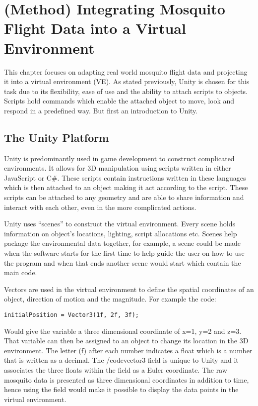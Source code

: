 \chapter{(Method) Integrating Mosquito Flight Data into a Virtual Environment}

This chapter focuses on adapting real world mosquito flight data and projecting it into a virtual environment (VE). As stated previously, Unity is chosen for this task due to its flexibility, ease of use and the ability to attach scripts to objects. Scripts hold commands which enable the attached object to move, look and respond in a predefined way. But first an introduction to Unity.

\section{The Unity Platform}
Unity is predominantly used in game development to construct complicated environments. It allows for 3D manipulation using scripts written in either JavaScript or C\#. These scripts contain instructions written in these languages which is then attached to an object making it act according to the script. These scripts can be attached to any geometry and are able to share information and interact with each other, even in the more complicated actions.

Unity uses ``scenes'' to construct the virtual environment. Every scene holds information on object's locations, lighting, script allocations etc. Scenes help package the environmental data together, for example, a scene could be made when the software starts for the first time to help guide the user on how to use the program and when that ends another scene would start which contain the main code.

Vectors are used in the virtual environment to define the spatial coordinates of an object, direction of motion and the magnitude. For example the code:

\begin{verbatim}
initialPosition = Vector3(1f, 2f, 3f);
\end{verbatim}

Would give the variable  a three dimensional coordinate of x=1, y=2 and z=3. That variable can then be assigned to an object to change its location in the 3D environment. The letter (f) after each number indicates a float which is a number that is written as a decimal. The /code{vector3} field  is unique to Unity and it associates the three floats within the field as a Euler coordinate. The raw mosquito data is presented as three dimensional coordinates in addition to time, hence using the  field would make it possible to display the data points in the virtual environment.

